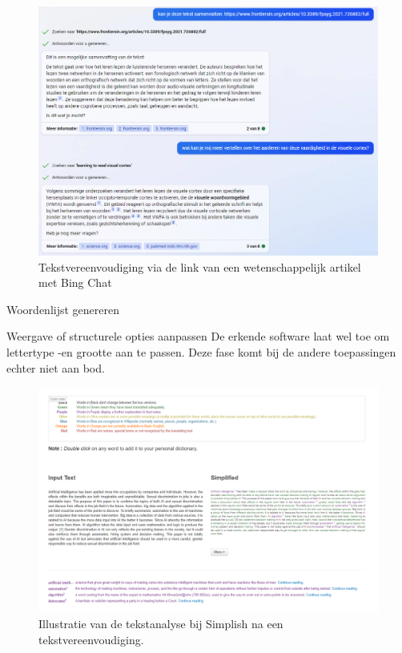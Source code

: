 \begin{figure}[H]
	\includegraphics{img/bing-ai-chatbot-example.png}
	\caption{Tekstvereenvoudiging via de link van een wetenschappelijk artikel met Bing Chat}
	\label{img:tryout-bing-ai}
\end{figure}

\medspace

Woordenlijst genereren



Weergave of structurele opties aanpassen
De erkende software laat wel toe om lettertype -en grootte aan te passen. Deze fase komt bij de andere toepassingen echter niet aan bod.

\medspace

\begin{figure}[H]
	\includegraphics[width=\linewidth]{img/simplish-output.png}
	\caption{Illustratie van de tekstanalyse bij Simplish na een tekstvereenvoudiging.}
	\label{img:simplish-output}
\end{figure}

